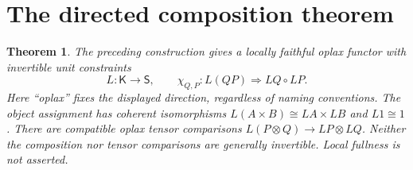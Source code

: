 \documentclass[11pt]{article}
\newtheorem{theorem}{Theorem}\newtheorem{proposition}[theorem]{Proposition}
\begin{document}
\section{The directed composition theorem}
\begin{theorem}
The preceding construction gives a locally faithful oplax functor with invertible unit constraints
\[
 L:\mathsf K\longrightarrow\mathsf S,
 \qquad \chi_{Q,P}:L(QP)\Longrightarrow LQ\circ LP.
\]
Here ``oplax'' fixes the displayed direction, regardless of naming conventions. The object assignment has coherent isomorphisms $L(A\times B)\cong LA\times LB$ and $L1\cong1$. There are compatible oplax tensor comparisons $L(P\otimes Q)\to LP\otimes LQ$. Neither the composition nor tensor comparisons are generally invertible. Local fullness is not asserted.
\end{theorem}
\end{document}
